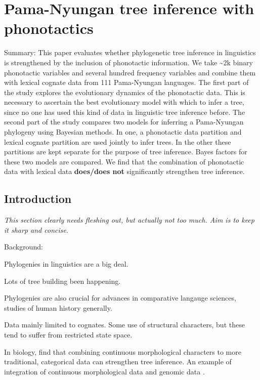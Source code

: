 \chapter[Pama-Nyungan tree inference with phonotactics]{Pama-Nyungan tree inference with phonotactics}
\label{ch-pn-treebuilding}	%
\pagestyle{headings}

Summary: This paper evaluates whether phylogenetic tree inference in linguistics is strengthened by the inclusion of phonotactic information. We take \textasciitilde{}2k binary phonotactic variables and several hundred frequency variables and combine them with lexical cognate data from 111 Pama-Nyungan languages. The first part of the study explores the evolutionary dynamics of the phonotactic data. This is necessary to ascertain the best evolutionary model with which to infer a tree, since no one has used this kind of data in linguistic tree inference before. The second part of the study compares two models for inferring a Pama-Nyungan phylogeny using Bayesian methods. In one, a phonotactic data partition and lexical cognate partition are used jointly to infer trees. In the other these partitions are kept separate for the purpose of tree inference. Bayes factors for these two models are compared. We find that the combination of phonotactic data with lexical data \textbf{does/does not} significantly strengthen tree inference.

\hypertarget{pn-tree-intro}{%
\section{Introduction}\label{pn-tree-intro}}

\emph{This section clearly needs fleshing out, but actually not too much. Aim is to keep it sharp and concise}.

Background:

Phylogenies in linguistics are a big deal.

Lots of tree building been happening.

Phylogenies are also crucial for advances in comparative langauge sciences, studies of human history generally.

Data mainly limited to cognates. Some use of structural characters, but these tend to suffer from restricted state space.

In biology, \textcite{parins-fukuchi_use_2018} find that combining continuous morphological characters to more traditional, categorical data can strengthen tree inference. An example of integration of continuous morphological data and genomic data \textcite{domel_combining_2019}.

